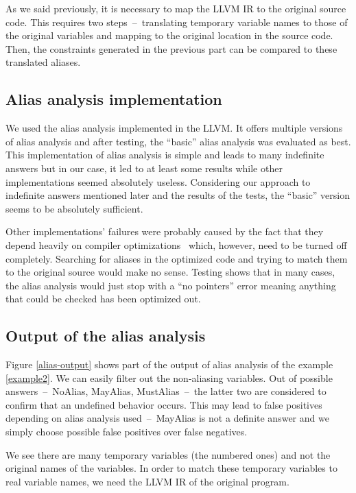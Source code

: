As we said previously, it is necessary to map the LLVM IR to the original source code. This requires two steps~--~translating temporary variable names to those of the original variables and mapping to the original location in the source code. Then, the constraints generated in the previous part can be compared to these translated aliases.

\subsection{Alias analysis implementation}
We used the alias analysis implemented in the LLVM. It offers multiple versions of alias analysis and after testing, the ``basic'' alias analysis was evaluated as best. This implementation of alias analysis is simple and leads to many indefinite answers but in our case, it led to at least some results while other implementations seemed absolutely useless. Considering our approach to indefinite answers mentioned later and the results of the tests, the ``basic'' version seems to be absolutely sufficient.

Other implementations' failures were probably caused by the fact that they depend heavily on compiler optimizations~\cite{alias-analysis-optimizations} which, however, need to be turned off completely. Searching for aliases in the optimized code and trying to match them to the original source would make no sense. Testing shows that in many cases, the alias analysis would just stop with a ``no pointers'' error meaning anything that could be checked has been optimized out.

\subsection{Output of the alias analysis}
Figure \ref{alias-output} shows part of the output of alias analysis of the example \ref{example2}. We can easily filter out the non-aliasing variables. Out of possible answers~--~NoAlias, MayAlias, MustAlias~--~the latter two are considered to confirm that an undefined behavior occurs. This may lead to false positives depending on alias analysis used~--~MayAlias is not a definite answer and we simply choose possible false positives over false negatives.

We see there are many temporary variables (the numbered ones) and not the original names of the variables. In order to match these temporary variables to real variable names, we need the LLVM IR of the original program.

